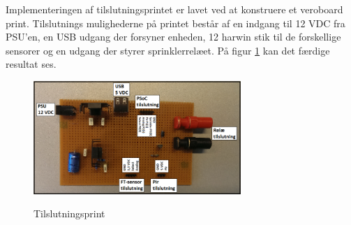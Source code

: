 Implementeringen af tilslutningsprintet er lavet ved at konstruere et veroboard print. Tilslutnings mulighederne på printet består af en indgang til 12 VDC fra PSU'en, en USB udgang der forsyner enheden, 12 harwin stik til de forskellige sensorer og en udgang der styrer sprinklerrelæet. På figur \ref{lab:Tilslutningsprint} kan det færdige resultat ses. 

\begin{figure}[htb]
\centering
{\includegraphics[width=0.70\textwidth]{filer/implementering/Tilslutningsprint}}
\caption{Tilslutningsprint}
\label{lab:Tilslutningsprint}
\end{figure}


